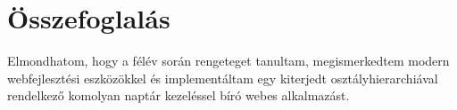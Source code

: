 \chapter{Összefoglalás}\label{sect:Summary}

Elmondhatom, hogy a félév során rengeteget tanultam, megismerkedtem modern webfejlesztési eszközökkel és implementáltam egy kiterjedt osztályhierarchiával rendelkező komolyan naptár kezeléssel bíró webes alkalmazást. 